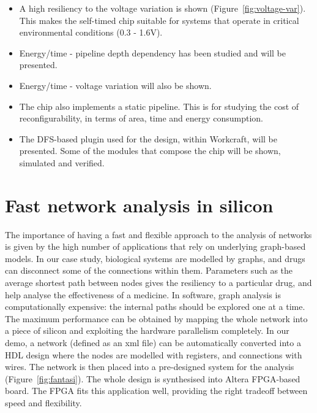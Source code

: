 \documentclass[conference]{IEEEtran}
\begin{document}
\begin{itemize}
\item A high resiliency to the voltage variation is shown (Figure~\ref{fig:voltage-var}).
This makes the self-timed chip suitable for systems that operate in critical environmental conditions (0.3 - 1.6V).
\item Energy/time - pipeline depth dependency has been studied and will be presented.
\item Energy/time - voltage variation will also be shown.
\item The chip also implements a static pipeline. This is for studying the
cost of reconfigurability, in terms of area, time and energy consumption.
\item The DFS-based plugin used for the design, within Workcraft, will be presented.
Some of the modules that compose the chip will be shown, simulated and verified.
\end{itemize}

\section*{Fast network analysis in silicon}
The importance of having a fast and flexible approach to the analysis of networks is given by the high number of applications that rely on underlying graph-based models. In our case study, biological systems are modelled by graphs, and drugs can disconnect some of the connections within them. Parameters such as the average shortest path between nodes gives the resiliency to a particular drug, and help analyse the effectiveness of a medicine. In software, graph analysis is computationally expensive: the internal paths should be explored one at a time. %
The maximum performance can be obtained by mapping the whole network into a piece of silicon and exploiting the hardware parallelism completely. In our demo, a network (defined as an xml file) can be automatically converted into a HDL design where the nodes are modelled with registers, and connections with wires. The network is then placed into a pre-designed system for the analysis (Figure~\ref{fig:fantasi}). The whole design is synthesised into Altera FPGA-based board. The FPGA fits this application well, providing the right tradeoff between speed and flexibility.
\end{document}

